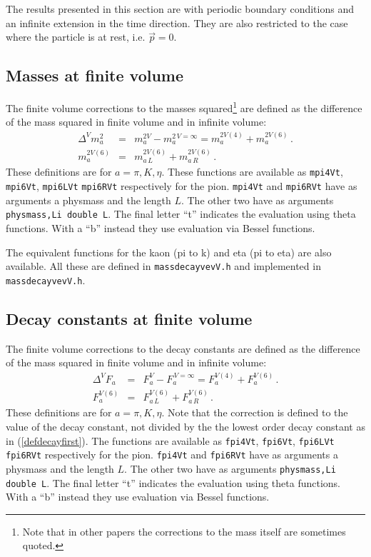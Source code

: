 \documentclass[12pt,a4paper]{article}
\begin{document}
The results presented in this section are with periodic boundary conditions
and an infinite extension in the time direction. They are also restricted
to the case where the particle is at rest, i.e. $\vec p=0$.

\subsection{Masses at finite volume}

The finite volume corrections to the masses squared\footnote{Note that
in other papers the corrections to the mass itself are sometimes
quoted.} are defined as the difference of the mass squared in finite volume
and in infinite volume:
\begin{eqnarray}
\Delta^V m^2_a &=& m^{2V}_a-m^{2\,V=\infty}_a
= m_a^{2V(4)}+ m_a^{2V(6)}\,.
\nonumber\\
m_a^{2V(6)} &=& m_{a\,L}^{2V(6)}+m_{a\,R}^{2V(6)}\,.
\end{eqnarray}
These definitions are for $a=\pi,K,\eta$.
These functions are available as
\texttt{mpi4Vt}, \texttt{mpi6Vt}, \texttt{mpi6LVt} \texttt{mpi6RVt}
respectively for the pion. \texttt{mpi4Vt} and \texttt{mpi6RVt}
have as arguments
a physmass and the length $L$. The other two have as arguments
\texttt{physmass,Li double L}. The final letter ``t'' indicates
the evaluation using  theta functions. With a ``b'' instead they use
evaluation via Bessel functions.

The equivalent functions for the kaon (pi to k) and eta (pi to eta)
are also available. All these are defined in \texttt{massdecayvevV.h}
and implemented in \texttt{massdecayvevV.h}.

\subsection{Decay constants at finite volume}

The finite volume corrections to the decay constants
 are defined as the difference of the mass squared in finite volume
and in infinite volume:
\begin{eqnarray}
\label{defdecayV}
\Delta^V F_a &=& F^{V}_a-F^{\,V=\infty}_a
= F_a^{V(4)}+ F_a^{V(6)}\,.
\nonumber\\
F_a^{V(6)} &=& F_{a\,L}^{V(6)}+F_{a\,R}^{V(6)}\,.
\end{eqnarray}
These definitions are for $a=\pi,K,\eta$.
Note that the correction is defined to the value of the
decay constant, not divided by the the lowest order decay constant as
in (\ref{defdecayfirst}).
The functions are available as
\texttt{fpi4Vt}, \texttt{fpi6Vt}, \texttt{fpi6LVt} \texttt{fpi6RVt}
respectively for the pion. \texttt{fpi4Vt} and \texttt{fpi6RVt}
have as arguments
a physmass and the length $L$. The other two have as arguments
\texttt{physmass,Li double L}. The final letter ``t'' indicates
the evaluation using  theta functions. With a ``b'' instead they use
evaluation via Bessel functions.
\end{document}
